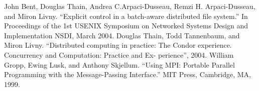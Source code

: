 \begin{thebibliography}{99}
 John Bent, Douglas Thain, Andrea C.Arpaci-Dusseau, Remzi H. Arpaci-Dusseau, and Miron Livny. ``Explicit control in a batch-aware distributed file system.'' In Proceedings of the 1st USENIX Symposium on Networked Systems Design and Implementation NSDI, March 2004.
 Douglas Thain, Todd Tannenbaum, and Miron Livny. ``Distributed computing in practice: The Condor experience. Concurrency and Computation: Practice and Ex- perience'', 2004.
 William Gropp, Ewing Lusk, and Anthony Skjellum.
``Using MPI: Portable Parallel Programming with the Message-Passing Interface.''
MIT Press, Cambridge, MA, 1999.
\end{thebibliography}

